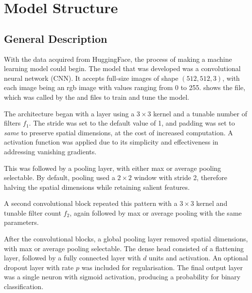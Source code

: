 
\newpage

\section{Model Structure}

\subsection{General Description}

With the data acquired from HuggingFace, the process of making a machine learning model could begin. The model that was developed was a convolutional neural network (CNN). It accepts full-size images of shape $(512, 512, 3)$, with each image being an rgb image with values ranging from 0 to 255.  shows the  file, which was called by the  and  files to train and tune the model.

\begin{figure}[h]
    
\end{figure}

The architecture began with a  layer using a $3{\times}3$ kernel and a tunable number of filters $f_{1}$. The stride was set to the default value of 1, and padding was set to \emph{same} to preserve spatial dimensions, at the cost of increased computation. A  activation function was applied due to its simplicity and effectiveness in addressing vanishing gradients.

This was followed by a pooling layer, with either max or average pooling selectable. By default, pooling used a $2{\times}2$ window with stride 2, therefore halving the spatial dimensions while retaining salient features.

A second convolutional block repeated this pattern with a $3{\times}3$ kernel and tunable filter count $f_{2}$, again followed by max or average pooling with the same parameters.

After the convolutional blocks, a global pooling layer removed spatial dimensions, with max or average pooling selectable. The dense head consisted of a flattening layer, followed by a fully connected layer with $d$ units and  activation. An optional dropout layer with rate $p$ was included for regularisation. The final output layer was a single neuron with sigmoid activation, producing a probability for binary classification.

